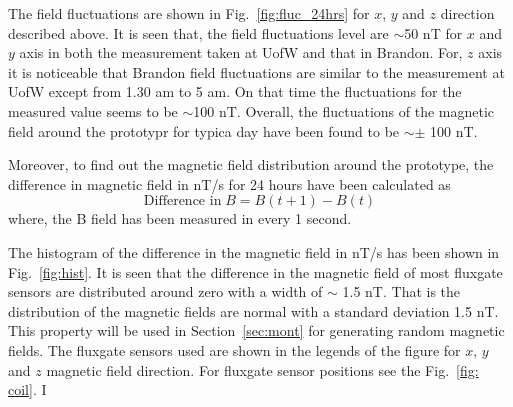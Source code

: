 
The field fluctuations are shown in Fig.~\ref{fig:fluc_24hrs} for $x$, $y$ and $z$ direction described above. It is seen that, the field fluctuations level are $\sim$50 nT for $x$ and $y$ axis in both the measurement taken at UofW and that in Brandon. For, $z$ axis it is noticeable that Brandon field fluctuations are similar to the measurement at UofW except from 1.30 am to 5 am. On that time the fluctuations for the measured value seems to be $\sim$100 nT. Overall, the fluctuations of the magnetic field around the prototypr for typica day have been found to be $\sim \pm$ 100 nT.


\FloatBarrier
Moreover, to find out the magnetic field distribution around the prototype, the difference in magnetic field in nT/s for 24 hours have been calculated as 
\begin{equation}
    \text{Difference in}\;B=B(t+1)-B(t)
\end{equation}
where, the B field has been measured in every 1 second.

The histogram of the difference in the magnetic field in nT/s has been shown in Fig.~\ref{fig:hist}. It is seen that the difference in the magnetic field of most fluxgate sensors are distributed around zero with a width of $\sim$ 1.5 nT. That is the distribution of the magnetic fields are normal with a standard deviation 1.5 nT. This property will be used in Section~\ref{sec:mont} for generating random magnetic fields. The fluxgate sensors used are shown in the legends of the figure for $x$, $y$ and $z$ magnetic field direction. For fluxgate sensor positions see the Fig.~\ref{fig: coil}. I

